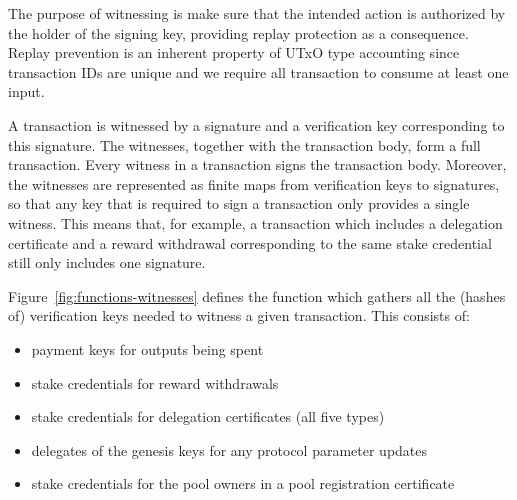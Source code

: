 The purpose of witnessing is make sure that the intended action is authorized by
the holder of the signing key, providing replay protection as a consequence.
Replay prevention is an inherent property of UTxO type accounting
since transaction IDs are unique and we require all transaction to
consume at least one input.

A transaction is witnessed by a signature and a verification key corresponding
to this signature.  The witnesses, together with the transaction body, form a
full transaction.  Every witness in a transaction signs the transaction body.
Moreover, the witnesses are represented as finite maps from verification keys to
signatures, so that any key that is required to sign a transaction only provides
a single witness.  This means that, for example, a transaction which includes a
delegation certificate and a reward withdrawal corresponding to the same stake
credential still only includes one signature.

Figure~\ref{fig:functions-witnesses} defines the function which
gathers all the (hashes of) verification keys needed to witness a given transaction.
This consists of:
\begin{itemize}
  \item payment keys for outputs being spent
  \item stake credentials for reward withdrawals
  \item stake credentials for delegation certificates (all five types)
  \item delegates of the genesis keys for any protocol parameter updates
  \item stake credentials for the pool owners in a pool registration certificate
\end{itemize}

